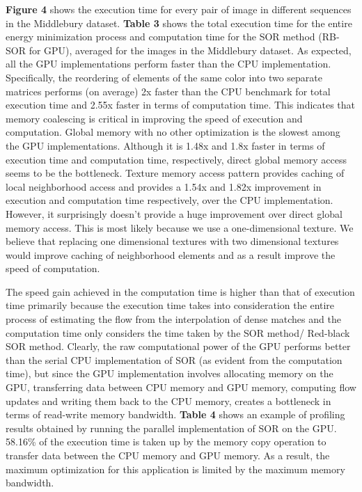 \documentclass[english]{article}
\begin{document}
	\textbf{Figure 4} shows the execution time for every pair of image in different sequences in the Middlebury dataset. \textbf{Table 3} shows the total execution time for the entire energy minimization process and computation time for the SOR method (RB-SOR for GPU), averaged for the images in the Middlebury dataset. As expected, all the GPU implementations perform faster than the CPU implementation. Specifically, the reordering of elements of the same color into two separate matrices performs (on average) 2x faster than the CPU benchmark for total execution time and 2.55x faster in terms of computation time. This indicates that memory coalescing is critical in improving the speed of execution and computation. Global memory with no other optimization is the slowest among the GPU implementations. Although it is 1.48x and 1.8x faster in terms of execution time and computation time, respectively, direct global memory access seems to be the bottleneck. Texture memory access pattern provides caching of local neighborhood access and provides a 1.54x and 1.82x improvement in execution and computation time respectively, over the CPU implementation. However, it surprisingly doesn’t provide a huge improvement over direct global memory access. This is most likely because we use a one-dimensional texture. We believe that replacing one dimensional textures with two dimensional textures would improve caching of neighborhood elements and as a result improve the speed of computation.

	\begin{center}
	\end{center}

	The speed gain achieved in the computation time is  higher than that of execution time primarily because the execution time takes into consideration the entire process of estimating the flow from the interpolation of dense matches and the computation time only considers the time taken by the SOR method/ Red-black SOR method. Clearly, the raw computational power of the GPU performs better than the serial CPU implementation of SOR (as evident from the computation time), but since the GPU implementation involves allocating memory on the GPU, transferring data between CPU memory and GPU memory, computing flow updates and writing them back to the CPU memory, creates a bottleneck in terms of read-write memory bandwidth. \textbf{Table 4} shows an example of profiling results obtained by running the parallel implementation of SOR on the GPU. 58.16\% of the execution time is taken up by the memory copy operation to transfer data between the CPU memory and GPU memory. As a result, the maximum optimization for this application is limited by the maximum memory bandwidth.
\end{document}
